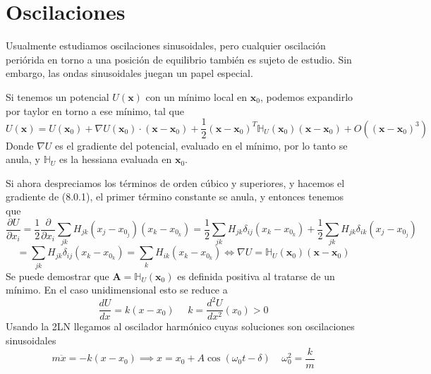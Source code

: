 \chapter{Oscilaciones}
Usualmente estudiamos oscilaciones sinusoidales, pero cualquier oscilación periórida en torno a una posición de equilibrio también es sujeto de estudio. Sin embargo, las ondas sinusoidales juegan un papel especial.

Si tenemos un potencial $U(\mathbf{x})$ con un mínimo local en $\mathbf{x}_0$, podemos expandirlo por taylor en torno a ese mínimo, tal que
\begin{equation} \label{6.1.1}
    U(\mathbf{x}) = U(\mathbf{x}_0) + \nabla U (\mathbf{x}_0) \cdot (\mathbf{x}-\mathbf{x}_0) + \frac{1}{2}(\mathbf{x}-\mathbf{x}_0)^T \mathbb{H}_U (\mathbf{x}_0)(\mathbf{x}-\mathbf{x}_0) + O((\mathbf{x}-\mathbf{x}_0)^3)
\end{equation}
Donde $\nabla U$ es el gradiente del potencial, evaluado en el mínimo, por lo tanto se anula, y $\mathbb{H}_U$ es la hessiana evaluada en $\mathbf{x}_0$.

Si ahora despreciamos los términos de orden cúbico y superiores, y hacemos el gradiente de (8.0.1), el primer término constante se anula, y entonces tenemos que 
\[
    \frac{\partial U}{\partial x_i} = \frac{1}{2}\frac{\partial}{\partial x_i} \sum_{jk} H_{jk} (x_j-x_{0_j})(x_k-x_{0_k}) = \frac{1}{2}\sum_{jk} H_{jk} \delta_{ij} (x_k-x_{0_k}) + \frac{1}{2}\sum_{jk} H_{jk} \delta_{ik} (x_j-x_{0_j})
\] \vspace{-15pt}
\begin{equation} \label{6.1.1}
    = \sum_{jk} H_{jk} \delta_{ij} (x_k-x_{0_k}) = \sum_{k} H_{ik} (x_k-x_{0_k}) \iff \nabla U = \mathbb{H}_U (\mathbf{x}_0)(\mathbf{x}-\mathbf{x}_0)
\end{equation}
Se puede demostrar que $\mathbf{A} = \mathbb{H}_U (\mathbf{x}_0)$ es definida positiva al tratarse de un mínimo. En el caso unidimensional esto se reduce a 
\begin{equation} \label{6.1.1}
    \frac{dU}{dx} = k (x-x_0) \ \ \ \ \ \ k = \frac{d^2 U}{dx^2}(x_0) > 0
\end{equation}
Usando la 2LN llegamos al oscilador harmónico cuyas soluciones son oscilaciones sinusoidales
\begin{equation} \label{6.1.1}
    m\ddot{x} = - k(x-x_0) \implies x = x_0 + A\cos(\omega_0 t - \delta)\ \ \ \ \ \omega_0^2 = \frac{k}{m}
\end{equation}
\vspace{-25pt}
